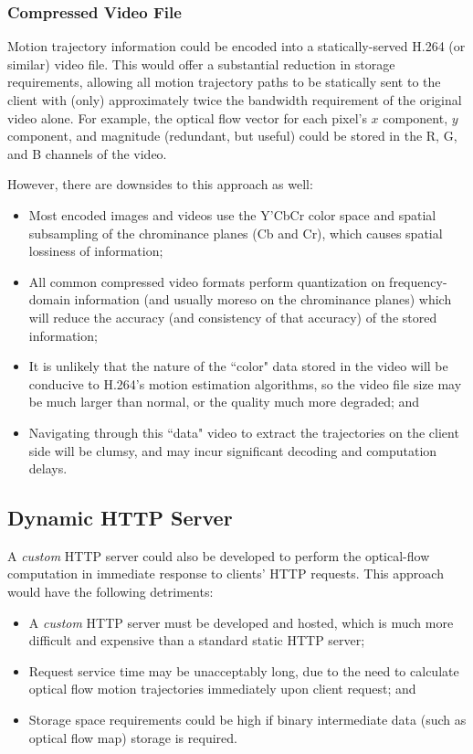 \subsubsection{Compressed Video File}
Motion trajectory information could be encoded into a statically-served H.264 (or similar) video file. This would offer a substantial reduction in storage requirements, allowing all motion trajectory paths to be statically sent to the client with (only) approximately twice the bandwidth requirement of the original video alone. For example, the optical flow vector for each pixel's $x$ component, $y$ component, and magnitude (redundant, but useful) could be stored in the R, G, and B channels of the video.
\par However, there are downsides to this approach as well:\cite{h264}
\begin{itemize}
    \item Most encoded images and videos use the Y'CbCr color space\cite{ycbcr} and spatial subsampling of the chrominance planes (Cb and Cr), which causes spatial lossiness of information;
    \item All common compressed video formats perform quantization on frequency-domain information (and usually moreso on the chrominance planes) which will reduce the accuracy (and consistency of that accuracy) of the stored information;
    \item It is unlikely that the nature of the ``color" data stored in the video will be conducive to H.264's motion estimation algorithms, so the video file size may be much larger than normal, or the quality much more degraded; and
    \item Navigating through this ``data" video to extract the trajectories on the client side will be clumsy, and may incur significant decoding and computation delays.
\end{itemize}

\subsection{Dynamic HTTP Server}
A \emph{custom} HTTP server could also be developed to perform the optical-flow computation in immediate response to clients' HTTP requests.\cite{dynamicweb} This approach would have the following detriments:
\begin{itemize}
    \item A \emph{custom} HTTP server must be developed and hosted, which is much more difficult and expensive than a standard static HTTP server;
    \item Request service time may be unacceptably long, due to the need to calculate optical flow motion trajectories immediately upon client request; and
    \item Storage space requirements could be high if binary intermediate data (such as optical flow map) storage is required.
\end{itemize}

